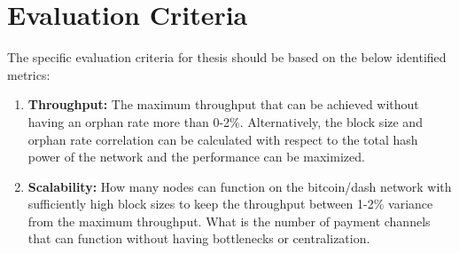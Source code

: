 \documentclass[journal,12pt,onecolumn,draftclsnofoot,]{IEEEtran}
\begin{document}
\section{Evaluation Criteria}
The specific evaluation criteria for thesis should be based on the below
identified metrics:

\begin{enumerate}
    \item \textbf{Throughput: } The maximum throughput that can be achieved
        without having an orphan rate more than 0-2\%. Alternatively, the block
        size and orphan rate correlation can be calculated with respect to the
        total hash power of the network and the performance can be maximized. 

    \item \textbf{Scalability: } How many nodes can function on the bitcoin/dash
        network with sufficiently high block sizes to keep the throughput
        between 1-2\% variance from the maximum throughput. 
        What is the number of payment channels that can function without having
        bottlenecks or centralization. 


\end{enumerate}
\end{document}

